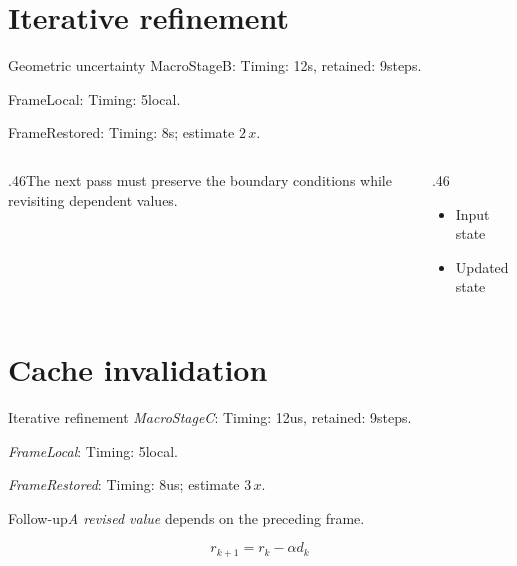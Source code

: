 \documentclass[10pt,aspectratio=169]{beamer}
\newcommand{\fuzzlayerA}[1]{\textit{#1}}
\newcommand{\fuzzlayerB}[1]{\fuzzlayerA{#1}}
\newcommand{\fuzzterm}[1]{\fuzzlayerB{#1}}
\newcommand{\fuzzpair}[2]{\fuzzterm{#1}: #2}
\newcommand{\fuzzunit}{steps}
\let\fuzzoriginalunit\fuzzunit
\newcommand{\fuzzcoefficient}{2}
\newcommand{\fuzzscale}[2][\fuzzcoefficient]{#1\,#2}
\begin{document}
\renewcommand{\fuzzunit}{s}
\renewcommand{\fuzzcoefficient}{2}
\renewcommand{\fuzzterm}[1]{{\textrm{#1}}}
\section{Iterative refinement}
\begin{frame}[t]{Geometric uncertainty}
\fuzzpair{MacroStageB}{Timing: 12\fuzzunit, retained: 9\fuzzoriginalunit.}\par
{\renewcommand{\fuzzunit}{local}\fuzzpair{FrameLocal}{Timing: 5\fuzzunit.}\par}
\fuzzpair{FrameRestored}{Timing: 8\fuzzunit; estimate $\fuzzscale{x}$.}\par
\begin{columns}[T]\begin{column}{.46\textwidth}The next pass must preserve the boundary conditions while revisiting dependent values.\end{column}\begin{column}{.46\textwidth}\begin{itemize}\item Input state\item Updated state\end{itemize}\end{column}\end{columns}
\end{frame}
\renewcommand{\fuzzunit}{us}
\renewcommand{\fuzzcoefficient}{3}
\renewcommand{\fuzzterm}[1]{{\textit{#1}}}
\section{Cache invalidation}
\begin{frame}[t]{Iterative refinement}
\fuzzpair{MacroStageC}{Timing: 12\fuzzunit, retained: 9\fuzzoriginalunit.}\par
{\renewcommand{\fuzzunit}{local}\fuzzpair{FrameLocal}{Timing: 5\fuzzunit.}\par}
\fuzzpair{FrameRestored}{Timing: 8\fuzzunit; estimate $\fuzzscale{x}$.}\par
\begin{block}{Follow-up}\fuzzterm{A revised value} depends on the preceding frame.\end{block}
\[r_{k+1}=r_k-\alpha d_k\]
\end{frame}
\renewcommand{\fuzzunit}{min}
\renewcommand{\fuzzcoefficient}{4}
\renewcommand{\fuzzterm}[1]{{\textrm{#1}}}
\end{document}
